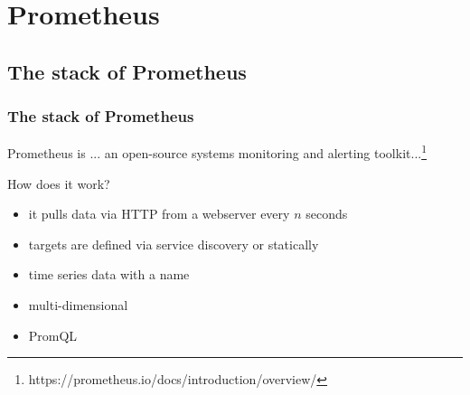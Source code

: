 \section{Prometheus}
\subsection{The stack of Prometheus}
\begin{frame}
  \frametitle{The stack of Prometheus}   
  \begin{block}{Prometheus is ...}
    an open-source systems monitoring and alerting toolkit...\footnote{https://prometheus.io/docs/introduction/overview/}
  \end{block}
  
  How does it work?
  \begin{itemize}
   \item it pulls data via HTTP from a webserver every $n$ seconds
   \item targets are defined via service discovery or statically
   \item time series data with a name\\ 
   \item multi-dimensional\\ 
   \item PromQL \\ 
  \end{itemize}
  
\end{frame}

